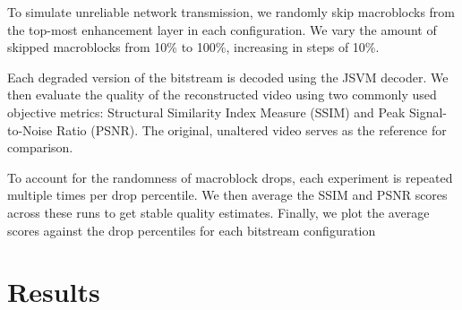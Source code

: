 To simulate unreliable network transmission, we randomly skip macroblocks from
the top-most enhancement layer in each configuration. We vary the amount of
skipped macroblocks from 10\% to 100\%, increasing in steps of 10\%.

Each degraded version of the bitstream is decoded using the JSVM decoder. 
We then evaluate the quality of the reconstructed video using two commonly used
objective metrics: Structural Similarity Index Measure (SSIM) and Peak
Signal-to-Noise Ratio (PSNR). The original, unaltered video serves as the
reference for comparison.

To account for the randomness of macroblock drops, each experiment
is repeated multiple times per drop percentile. 
We then average the SSIM and PSNR scores across these runs to get stable quality
estimates. 
Finally, we plot the average scores against the drop percentiles for
each bitstream configuration

\section{Results}

